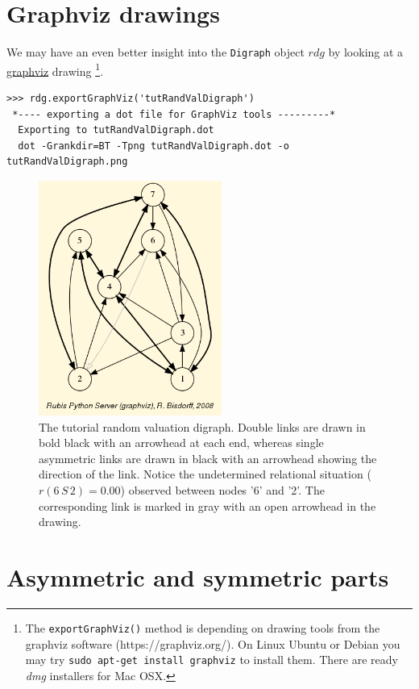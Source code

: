 \section{Graphviz drawings}
\label{sec:2.2}

We may have an even better insight into the \texttt{Digraph} object $rdg$ by looking at a \href{https://graphviz.org/}{graphviz} drawing \footnote{The \texttt{exportGraphViz()} method is depending on drawing tools from the graphviz software (https://graphviz.org/). On Linux Ubuntu or Debian you may try \texttt{sudo apt-get install graphviz} to install them. There are ready \emph{dmg} installers for Mac OSX.}.
\begin{lstlisting}
>>> rdg.exportGraphViz('tutRandValDigraph')
 *---- exporting a dot file for GraphViz tools ---------*
  Exporting to tutRandValDigraph.dot
  dot -Grankdir=BT -Tpng tutRandValDigraph.dot -o tutRandValDigraph.png
\end{lstlisting}
\begin{figure}[h]
\sidecaption
\includegraphics[width=6cm]{Figures/tutRandValDigraph.png}
\caption{The tutorial random valuation digraph. Double links are drawn in bold black with an arrowhead at each end, whereas single asymmetric links are drawn in black with an arrowhead showing the direction of the link. Notice the undetermined relational situation ($r(6\,S\,2) = 0.00$) observed between nodes '6' and '2'. The corresponding link is marked in gray with an open arrowhead in the drawing.}
\label{fig:2.1}       %
\end{figure}
  
\section{Asymmetric and symmetric parts}
\label{sec:2.3}

